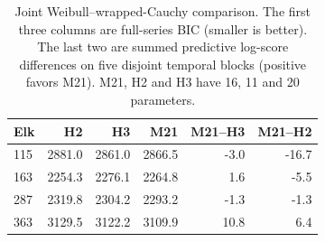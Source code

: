 \begin{table}[tbp]
\centering\small
\caption{Joint Weibull--wrapped-Cauchy comparison. The first three columns are full-series BIC (smaller is better). The last two are summed predictive log-score differences on five disjoint temporal blocks (positive favors M21). M21, H2 and H3 have 16, 11 and 20 parameters.}
\label{tab:elk-joint}
\begin{tabular}{lrrrrr}
\toprule
Elk & H2 & H3 & M21 & M21--H3 & M21--H2 \\
\midrule
115 & 2881.0 & 2861.0 & 2866.5 & -3.0 & -16.7 \\
163 & 2254.3 & 2276.1 & 2264.8 & 1.6 & -5.5 \\
287 & 2319.8 & 2304.2 & 2293.2 & -1.3 & -1.3 \\
363 & 3129.5 & 3122.2 & 3109.9 & 10.8 & 6.4 \\
\bottomrule
\end{tabular}
\end{table}
